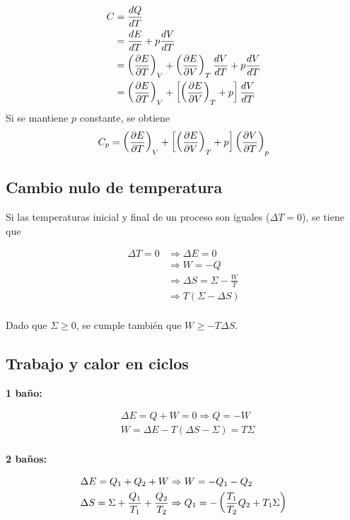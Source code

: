 \begin{equation}
\begin{split}
    C &= \frac{dQ}{dT}\\
    &= \frac{dE}{dT}+p\frac{dV}{dT}\\
    &= \devtermo{V}{E}{T}+\devtermo{T}{E}{V}\frac{dV}{dT}+
    p\frac{dV}{dT}\\
    &=\devtermo{V}{E}{T}+\lados{[}{\devtermo{T}{E}{V}+p}\frac{dV}{dT}\\
\end{split}
\nonumber
\end{equation}
Si se mantiene $p$ constante, se obtiene
\[C_p = \devtermo{V}{E}{T}+\lados{[}{\devtermo{T}{E}{V}+p}\devtermo{p}{V}{T}\]


\subsection{Cambio nulo de temperatura}
\label{DT=0}
Si las temperaturas inicial y final de un proceso son iguales ($\Delta T = 0$), se tiene que

\begin{equation}
\begin{split}
    \Delta T = 0 &\Rightarrow \Delta E = 0\\
    &\Rightarrow W=-Q\\
    &\Rightarrow \Delta S = \Sigma - \frac{W}{T}\\
    &\Rightarrow T(\Sigma-\Delta S)\\
\end{split}
\nonumber
\end{equation}

Dado que $\Sigma \geq 0$, se cumple también que $W\geq -T\Delta S$.

\subsection{Trabajo y calor en ciclos}
\label{TQciclos}
\textbf{1 baño:}

\begin{equation}
\begin{split}
    &\Delta E = Q + W = 0 \Rightarrow Q = -W\\
    &W = \Delta E - T(\Delta S-\Sigma) = T\Sigma\\
\end{split}
\nonumber
\end{equation}

\textbf{2 baños:}

\begin{equation}
\begin{split}
    &\Delta E = Q_1 + Q_2 + W \Rightarrow W = -Q_1-Q_2\\
    &\Delta S = \Sigma+\frac{Q_1}{T_1}+\frac{Q_2}{T_2}
    \Rightarrow Q_1 = -\lados{(}{\frac{T_1}{T_2}Q_2+T_1\Sigma}\\
\end{split}
\nonumber
\end{equation}

